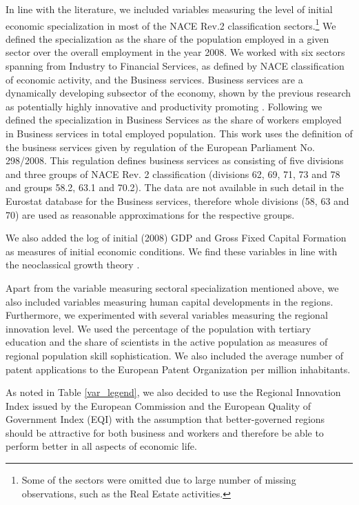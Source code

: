 \documentclass[11pt]{article}
\begin{document}
In line with the literature, we included variables measuring the level of initial economic specialization in most of the NACE Rev.2 classification sectors.\footnote{Some of the sectors were omitted due to large number of missing observations, such as the Real Estate activities.} We defined the specialization as the share of the population employed in a given sector over the overall employment in the year 2008. We worked with six sectors spanning from Industry to Financial Services, as defined by NACE classification of economic activity, and the Business services. Business services are a dynamically developing subsector of the economy, shown by the previous research as potentially highly innovative and productivity promoting \citep{corrocher2014kibs}. Following \citet{guastella2015knowledge} we defined the specialization in Business Services as the share of workers employed in Business services in total employed population. This work uses the definition of the business services given by regulation of the European Parliament No. 298/2008. This regulation defines business services as consisting of five divisions and three groups of NACE Rev. 2 classification (divisions 62, 69, 71, 73 and 78 and groups 58.2, 63.1 and 70.2). The data are not available in such detail in the Eurostat database for the Business services, therefore whole divisions (58, 63 and 70) are used as reasonable approximations for the respective groups.

We also added the log of initial (2008) GDP and Gross Fixed Capital Formation as measures of initial economic conditions. We find these variables in line with the neoclassical growth theory \cite{iammarino2017regional}.%

Apart from the variable measuring sectoral specialization mentioned above, we also included variables measuring human capital developments in the regions. Furthermore, we experimented with several variables measuring the regional innovation level. We used the percentage of the population with tertiary education and the share of scientists in the active population as measures of regional population skill sophistication. We also included the average number of patent applications to the European Patent Organization per million inhabitants. 

As noted in Table \ref{var_legend}, we also decided to use the Regional Innovation Index issued by the European Commission and the European Quality of Government Index (EQI) with the assumption that better-governed regions should be attractive for both business and workers and therefore be able to perform better in all aspects of economic life.
\end{document}
